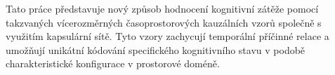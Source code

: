 Tato práce představuje nový způsob hodnocení kognitivní zátěže pomocí takzvaných
vícerozměrných časoprostorových kauzálních vzorů společně s využitím kapsulární
sítě. Tyto vzory zachycují temporální příčinné relace a umožňují unikátní
kódování specifického kognitivního stavu v podobě charakteristické konfigurace v
prostorové doméně.



